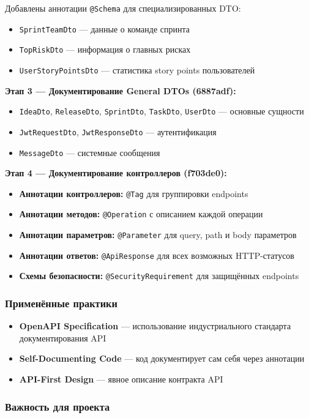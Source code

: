 \documentclass{article}
\begin{document}
Добавлены аннотации \texttt{@Schema} для специализированных DTO:
\begin{itemize}
\item \texttt{SprintTeamDto} --- данные о команде спринта
\item \texttt{TopRiskDto} --- информация о главных рисках
\item \texttt{UserStoryPointsDto} --- статистика story points пользователей
\end{itemize}
\textbf{Этап 3 --- Документирование General DTOs (6887adf):}
\begin{itemize}
\item \texttt{IdeaDto}, \texttt{ReleaseDto}, \texttt{SprintDto}, \texttt{TaskDto}, \texttt{UserDto} --- основные сущности
\item \texttt{JwtRequestDto}, \texttt{JwtResponseDto} --- аутентификация
\item \texttt{MessageDto} --- системные сообщения
\end{itemize}
\textbf{Этап 4 --- Документирование контроллеров (f703de0):}
\begin{itemize}
\item \textbf{Аннотации контроллеров:} \texttt{@Tag} для группировки endpoints
\item \textbf{Аннотации методов:} \texttt{@Operation} с описанием каждой операции
\item \textbf{Аннотации параметров:} \texttt{@Parameter} для query, path и body параметров
\item \textbf{Аннотации ответов:} \texttt{@ApiResponse} для всех возможных HTTP-статусов
\item \textbf{Схемы безопасности:} \texttt{@SecurityRequirement} для защищённых endpoints
\end{itemize}

\subsubsection{Применённые практики}
\begin{itemize}
\item \textbf{OpenAPI Specification} --- использование индустриального стандарта документирования API
\item \textbf{Self-Documenting Code} --- код документирует сам себя через аннотации
\item \textbf{API-First Design} --- явное описание контракта API
\end{itemize}

\subsubsection{Важность для проекта}
\end{document}

